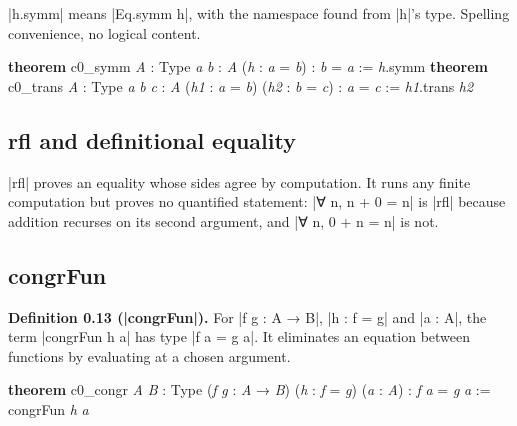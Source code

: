 \documentclass{memoir}
\begin{document}
\LeanVerb|h.symm| means \LeanVerb|Eq.symm h|, with the namespace found from \LeanVerb|h|'s type. Spelling
convenience, no logical content.

\begin{LeanVerbatim}
\textbf{theorem} c0_symm \textit{A} : Type \textit{a} \textit{b} : \textit{A} (\textit{h} : \textit{a} = \textit{b}) : \textit{b} = \textit{a} :=
  \textit{h}.symm
\textbf{theorem} c0_trans \textit{A} : Type \textit{a} \textit{b} \textit{c} : \textit{A} (\textit{h1} : \textit{a} = \textit{b})
    (\textit{h2} : \textit{b} = \textit{c}) : \textit{a} = \textit{c} :=
  \textit{h1}.trans \textit{h2}

\end{LeanVerbatim}




\subsection{rfl and definitional equality}\label{Two--Schemas--of--Impossibility-005F-005F-005F--Machine--Checked--Limits--of--Trustworthy--Machine--Learning-005F-005F-005F--and--Why--They--Tighten--with--Capability----Preliminaries----How--to--read--the--Lean--4----rfl--and--definitional--equality}

\LeanVerb|rfl| proves an equality whose sides agree by computation. It runs any finite
computation but proves no quantified statement: \LeanVerb|∀ n, n + 0 = n| is \LeanVerb|rfl|
because addition recurses on its second argument, and \LeanVerb|∀ n, 0 + n = n| is not.



\subsection{congrFun}\label{Two--Schemas--of--Impossibility-005F-005F-005F--Machine--Checked--Limits--of--Trustworthy--Machine--Learning-005F-005F-005F--and--Why--They--Tighten--with--Capability----Preliminaries----How--to--read--the--Lean--4----congrFun}

\textbf{Definition 0.13 (\LeanVerb|congrFun|).} For \LeanVerb|f g : A → B|, \LeanVerb|h : f = g| and \LeanVerb|a : A|, the
term \LeanVerb|congrFun h a| has type \LeanVerb|f a = g a|. It eliminates an equation between
functions by evaluating at a chosen argument.

\begin{LeanVerbatim}
\textbf{theorem} c0_congr \textit{A} \textit{B} : Type (\textit{f} \textit{g} : \textit{A} → \textit{B}) (\textit{h} : \textit{f} = \textit{g})
    (\textit{a} : \textit{A}) : \textit{f} \textit{a} = \textit{g} \textit{a} :=
  congrFun \textit{h} \textit{a}

\end{LeanVerbatim}
\end{document}
